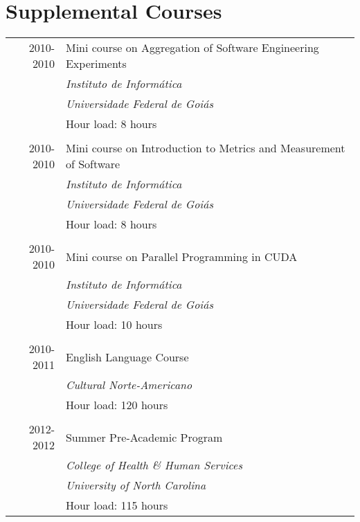 \documentclass[a4paper,10pt]{article}
\begin{document}
\section{Supplemental Courses}
\begin{tabular}{r p{12cm}}
  \textsc{2010-2010} & Mini course on Aggregation of Software Engineering Experiments\\ &
  \emph{Instituto de Informática} \\ &
  \emph{Universidade Federal de Goiás}\\ &
  Hour load: 8 hours
  \\&\\
  \textsc{2010-2010} & Mini course on Introduction to Metrics and Measurement of Software\\ &
  \emph{Instituto de Informática} \\ &
  \emph{Universidade Federal de Goiás}\\ &
  Hour load: 8 hours
  \\&\\
  \textsc{2010-2010} & Mini course on Parallel Programming in CUDA\\ &
  \emph{Instituto de Informática} \\ &
  \emph{Universidade Federal de Goiás}\\ &
  Hour load: 10 hours
  \\&\\
  \textsc{2010-2011} & English Language Course\\ &
  \emph{Cultural Norte-Americano} \\ &
  Hour load: 120 hours
  \\&\\
  \textsc{2012-2012} & Summer Pre-Academic Program\\ &
  \emph{College of Health \& Human Services}\\ &
  \emph{University of North Carolina}\\ &
  Hour load: 115 hours
\end{tabular}

\pagebreak
\end{document}

